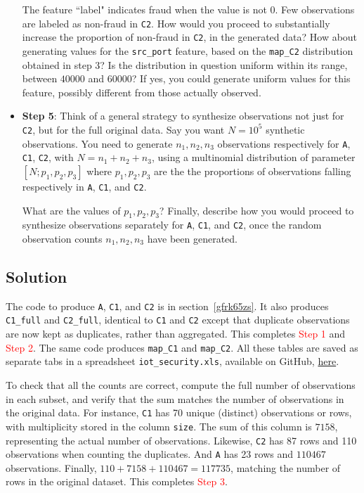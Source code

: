 \documentclass[oneside,10pt]{book}
\begin{document}
\begin{itemize}
\noindent The feature ``label" indicates fraud when the value is not 0. Few observations
 are labeled as non-fraud in \texttt{C2}. How would you proceed to substantially increase the proportion
 of non-fraud in \texttt{C2}, in the generated data? How about generating values for the \texttt{src\_port} feature, based on the \texttt{map\_C2} distribution obtained
 in step 3? Is the distribution in question uniform within its range, between $\num{40000}$
and $\num{60000}$? If yes, you could generate  uniform
 values for this feature, possibly different from those actually observed.
\vspace{1ex}

\item[] {\bf Step 5}: Think of a general strategy to synthesize observations not just for \texttt{C2}, but for the full
 original data. Say you want $N = 10^5$ synthetic observations. You need to generate $n_1, n_2, n_3$ observations respectively for
\texttt{A}, \texttt{C1}, \texttt{C2}, with $N = n_1 + n_2 + n_3$, using a
\textcolor{index}{multinomial distribution} of parameter $[N; p_1, p_2, p_3]$ where
  $p_1, p_2, p_3$ are the the proportions of observations falling respectively in \texttt{A}, \texttt{C1}, and \texttt{C2}.

What are the values of $p_1, p_2, p_3$? Finally, describe how you would proceed to synthesize observations
 separately for \texttt{A}, \texttt{C1}, and \texttt{C2}, once the random observation counts $n_1, n_2, n_3$ have been generated.

\end{itemize}

\subsection{Solution}

The code to produce \texttt{A}, \texttt{C1}, and \texttt{C2} is in section~\ref{gfrk65zs}. It also
produces \texttt{C1\_full} and \texttt{C2\_full}, identical to \texttt{C1} and \texttt{C2} except that duplicate observations are now kept as duplicates, rather
 than aggregated.
This completes \textcolor{red}{Step 1} and \textcolor{red}{Step 2}. The same code produces
 \texttt{map\_C1} and \texttt{map\_C2}. All these tables are saved as separate tabs
 in a spreadsheet \texttt{iot\_security.xls}, available on GitHub, \href{https://github.com/VincentGranville/Main/blob/main/iot_security.xlsx}{here}.

To check that all the counts are correct, compute the full number of observations in each subset, and verify that the sum matches
  the number of observations in the original data. For instance, \texttt{C1} has 70 unique (distinct) observations or rows, with multiplicity  stored
 in the column \texttt{size}. The sum of this column is $\num{7158}$, representing the actual number of observations.
 Likewise, \texttt{C2} has 87 rows and 110 observations when counting the duplicates. And \texttt{A} has
 23 rows and $\num{110467}$ observations. Finally, $110 + \num{7158} +\num{110467} = \num{117735}$, matching the number of rows in the original dataset.
This completes \textcolor{red}{Step 3}.
\end{document}
